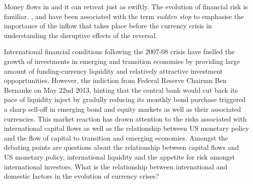 \documentclass[12pt, a4paper, oneside]{article} %
\begin{document}
Money flows in and it can retreat just as swiftly.  The evolution of financial risk is familiar. \citet{DornbuschSS}, \citet{CalvoSS} and \citet{KrugmanSS} have been associated with the term \emph{sudden stop} to emphasise the importance of the inflow that takes place before the currency crisis in understanding the disruptive effects of the reversal.   




International financial conditions following the 2007-08 crisis have fuelled the growth of investments in emerging and transition economies by providing large amount of funding-currency liquidity and relatively attractive investment oppoprtunities. However, the indiction from Federal Reserve Chairmn Ben Bernanke on May 22nd 2013, hinting that the central bank would cut back its pace of liquidity inject by gradully reducing its monthly bond purchase triggered a sharp sell-off in emerging bond and equity markets as well as their associated currencies.  This market reaction has drawn attention to the risks associated with international capital flows  as well as the relationship between US monetary policy and the flow of capital to transition and emerging economies.  Amongst the debating points are questions about the relationship between capital flows and US monetary policy, international liquidity and the appetite for risk amongst international investors. What is the relationship between international and domestic factors in the evolution of currency crises? 
\end{document}
